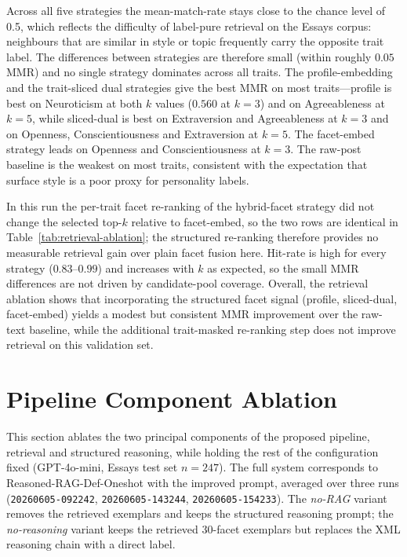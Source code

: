 \documentclass[../main.tex]{subfiles}
\begin{document}
Across all five strategies the mean-match-rate stays close to the chance level
of 0.5, which reflects the difficulty of label-pure retrieval on the Essays
corpus: neighbours that are similar in style or topic frequently carry the
opposite trait label. The differences between strategies are therefore small
(within roughly $0.05$ MMR) and no single strategy dominates across all traits.
The profile-embedding and the trait-sliced dual strategies give the best MMR on
most traits---profile is best on Neuroticism at both $k$ values ($0.560$ at
$k=3$) and on Agreeableness at $k=5$, while sliced-dual is best on Extraversion
and Agreeableness at $k=3$ and on Openness, Conscientiousness and Extraversion
at $k=5$. The facet-embed strategy leads on Openness and Conscientiousness at
$k=3$. The raw-post baseline is the weakest on most traits, consistent with the
expectation that surface style is a poor proxy for personality labels.

In this run the per-trait facet re-ranking of the hybrid-facet strategy did not
change the selected top-$k$ relative to facet-embed, so the two rows are
identical in Table~\ref{tab:retrieval-ablation}; the structured re-ranking
therefore provides no measurable retrieval gain over plain facet fusion here.
Hit-rate is high for every strategy ($0.83$--$0.99$) and increases with $k$ as
expected, so the small MMR differences are not driven by candidate-pool
coverage. Overall, the retrieval ablation shows that incorporating the
structured facet signal (profile, sliced-dual, facet-embed) yields a modest but
consistent MMR improvement over the raw-text baseline, while the additional
trait-masked re-ranking step does not improve retrieval on this validation set.

\section{Pipeline Component Ablation}
\label{sec:pipeline-ablation}


This section ablates the two principal components of the proposed pipeline,
retrieval and structured reasoning, while holding the rest of the configuration
fixed (GPT-4o-mini, Essays test set $n=247$). The full system corresponds to
Reasoned-RAG-Def-Oneshot with the improved prompt, averaged over three runs
(\texttt{20260605-092242}, \texttt{20260605-143244}, \texttt{20260605-154233}).
The \emph{no-RAG} variant removes the retrieved
exemplars and keeps the structured reasoning prompt; the \emph{no-reasoning}
variant keeps the retrieved 30-facet exemplars but replaces the XML reasoning
chain with a direct label.
\end{document}
